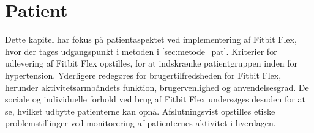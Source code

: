 \chapter{Patient}
Dette kapitel har fokus på patientaspektet ved implementering af Fitbit Flex, hvor der tages udgangspunkt i metoden i \autoref{sec:metode_pat}. Kriterier for udlevering af Fitbit Flex opstilles, for at indskrænke patientgruppen inden for hypertension. Yderligere redegøres for brugertilfredsheden for Fitbit Flex, herunder aktivitetsarmbåndets funktion, brugervenlighed og anvendelsesgrad. De sociale og individuelle forhold ved brug af Fitbit Flex undersøges desuden for at se, hvilket udbytte patienterne kan opnå. Afslutningsvist opstilles etiske problemstillinger ved monitorering af patienternes aktivitet i hverdagen.




